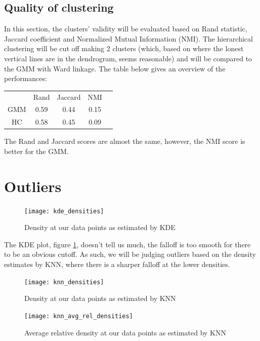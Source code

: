 \subsection{Quality of clustering}
In this section, the clusters' validity will be evaluated based on Rand statistic,
Jaccard coefficient and Normalized Mutual Information (NMI). The hierarchical clustering
will be cut off making 2 clusters (which, based on where the lonest vertical lines
are in the dendrogram, seems reasonable) and will be compared to the GMM with
Ward linkage. The table below gives an overview of the performances:\\
\begin{table}[h]
\centering
\begin{tabular}{ccccc}
    & Rand & Jaccard & NMI\\
GMM & 0.59 & 0.44 & 0.15 \\
HC & 0.58 & 0.45 & 0.09 \\
\end{tabular}
\end{table}

The Rand and Jaccard scores are almost the same, however, the NMI score is better
for the GMM.

\section{Outliers}
\begin{figure}[htb]
  \centering
  \texttt{[image: kde\_densities]}
  \caption{Density at our data points as estimated by KDE}
  \label{fig:kde}
\end{figure}

The KDE plot, figure \ref{fig:kde},
doesn't tell us much,
the falloff is too smooth
for there to be an obvious cutoff.
As such,
we will be judging outliers based on the
density estimates by KNN,
where there is a sharper falloff at the lower densities.

\begin{figure}[htb]
  \centering
  \texttt{[image: knn\_densities]}
  \caption{Density at our data points as estimated by KNN}
  \label{fig:knn}
\end{figure}

\begin{figure}[htb]
  \centering
  \texttt{[image: knn\_avg\_rel\_densities]}
  \caption{Average relative density at our data points as estimated by KNN}
  \label{fig:knn-avg-rel}
\end{figure}

